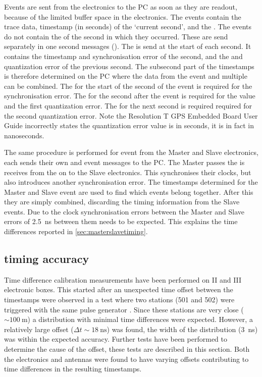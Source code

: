 Events are sent from the \hisparc electronics to the PC as soon as they are readout, because of the limited buffer space in the electronics. The events contain the trace data, timestamp (in seconds) of the `current second', and the \ctd. The events do not contain the \ctp of the second in which they occurred. These are send separately in one second messages (\osm). The \osm is send at the start of each second. It contains the timestamp and synchronisation error of the second, and the \ctp and quantization error of the previous second. The subsecond part of the timestamps is therefore determined on the PC where the data from the event and multiple \osm can be combined. The \osm for the start of the second of the event is required for the synchronisation error. The \osm for the second after the event is required for the \ctp value and the first quantization error. The \osm for the next second is required required for the second quantization error. Note the Resolution T GPS Embedded Board User Guide incorrectly states the quantization error value is in seconds, it is in fact in nanoseconds.

The same procedure is performed for event from the Master and Slave electronics, each sends their own \osm and event messages to the PC. The Master passes the \pps is receives from the \gps on to the Slave electronics. This synchronises their clocks, but also introduces another synchronisation error. The timestamps determined for the Master and Slave event are used to find which events belong together. After this they are simply combined, discarding the timing information from the Slave events. Due to the clock synchronisation errors between the Master and Slave errors of \SI{2.5}{\ns} between them needs to be expected. This explains the time differences reported in \cref{sec:masterslavetiming}.


\subsection{\gps timing accuracy}
\label{sec:gps_accuracy}

Time difference calibration measurements have been performed on \hisparc II and III electronic boxes. This started after an unexpected time offset between the timestamps were observed in a test where two \hisparc stations (501 and 502) were triggered with the same pulse generator \cite[p. 47]{fokkema2012hisparc}. Since these stations are very close ($\sim\SI{100}{\meter}$) a distribution with minimal time differences were expected. However, a relatively large offset ($\Delta t \sim\SI{18}{\ns}$) was found, the width of the distribution (\SI{3}{\ns}) was within the expected \gps accuracy. Further tests have been performed to determine the cause of the offset, these tests are described in this section. Both the \hisparc electronics and \gps antennas were found to have varying offsets contributing to time differences in the resulting timestamps.


